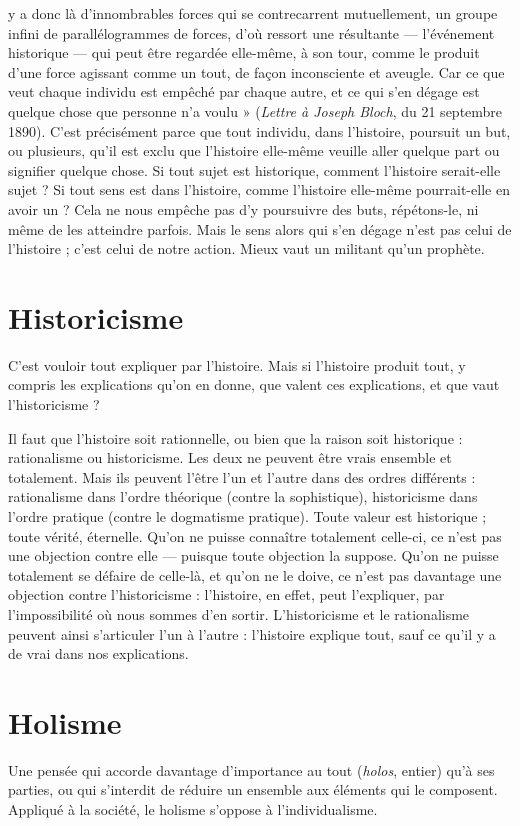 y a donc là d'innombrables forces qui se contrecarrent mutuellement, un
groupe infini de parallélogrammes de forces, d’où ressort une résultante — l’événement
historique — qui peut être regardée elle-même, à son tour, comme le
produit d’une force agissant comme un tout, de façon inconsciente et aveugle.
Car ce que veut chaque individu est empêché par chaque autre, et ce qui s’en
dégage est quelque chose que personne n’a voulu » ({\it Lettre à Joseph Bloch}, du
21 septembre 1890). C’est précisément parce que tout individu, dans l’histoire,
poursuit un but, ou plusieurs, qu’il est exclu que l’histoire elle-même veuille
aller quelque part ou signifier quelque chose. Si tout sujet est historique, comment
l’histoire serait-elle sujet ? Si tout sens est dans l’histoire, comme l’histoire
elle-même pourrait-elle en avoir un ? Cela ne nous empêche pas d’y poursuivre
des buts, répétons-le, ni même de les atteindre parfois. Mais le sens alors qui
s’en dégage n’est pas celui de l’histoire ; c’est celui de notre action. Mieux vaut
un militant qu’un prophète.

\section{Historicisme}
C'est vouloir tout expliquer par l’histoire. Mais si l’histoire
produit tout, y compris les explications qu’on en donne,
que valent ces explications, et que vaut l’historicisme ?

Il faut que l’histoire soit rationnelle, ou bien que la raison soit historique :
rationalisme ou historicisme. Les deux ne peuvent être vrais ensemble et totalement.
Mais ils peuvent l’être l’un et l’autre dans des ordres différents : rationalisme
dans l’ordre théorique (contre la sophistique), historicisme dans l’ordre
pratique (contre le dogmatisme pratique). Toute valeur est historique ; toute
vérité, éternelle. Qu’on ne puisse connaître totalement celle-ci, ce n’est pas une
objection contre elle — puisque toute objection la suppose. Qu’on ne puisse
totalement se défaire de celle-là, et qu’on ne le doive, ce n’est pas davantage une
objection contre l’historicisme : l’histoire, en effet, peut l’expliquer, par
l'impossibilité où nous sommes d’en sortir. L’historicisme et le rationalisme
peuvent ainsi s’articuler l’un à l’autre : l’histoire explique tout, sauf ce qu’il y a
de vrai dans nos explications.

\section{Holisme}
Une pensée qui accorde davantage d’importance au tout ({\it holos},
entier) qu’à ses parties, ou qui s’interdit de réduire un ensemble
aux éléments qui le composent. Appliqué à la société, le holisme s’oppose à
l’individualisme.

